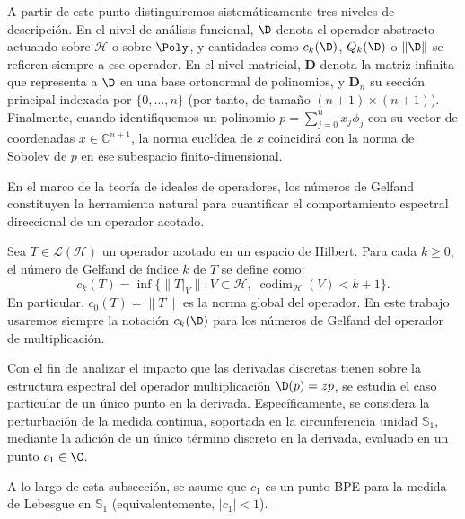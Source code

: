 \begin{rmk}
	A partir de este punto distinguiremos sistemáticamente tres niveles de descripción. En el nivel de análisis funcional, $\D$ denota el operador abstracto actuando sobre $\mathcal{H}$ o sobre $\Poly$, y cantidades como $c_k(\D)$, $Q_k(\D)$ o $\|\D\|$ se refieren siempre a ese operador. En el nivel matricial, $\mathbf{D}$ denota la matriz infinita que representa a $\D$ en una base ortonormal de polinomios, y $\mathbf{D}_n$ su sección principal indexada por $\{0,\dots,n\}$ (por tanto, de tamaño $(n+1)\times(n+1)$). Finalmente, cuando identifiquemos un polinomio $p = \sum_{j=0}^{n} x_j \phi_j$ con su vector de coordenadas $x \in \mathbb{C}^{n+1}$, la norma euclídea de $x$ coincidirá con la norma de Sobolev de $p$ en ese subespacio finito-dimensional.
\end{rmk}

En el marco de la teoría de ideales de operadores, los números de Gelfand constituyen la herramienta natural para cuantificar el comportamiento espectral direccional de un operador acotado.

\begin{defn}\label{def:numeros_gelfand}
	Sea $T \in \mathcal{L}(\mathcal{H})$ un operador acotado en un espacio de Hilbert. Para cada $k\ge 0$, el número de Gelfand de índice $k$ de $T$ se define como:
	\begin{equation}
		c_k(T) = \inf \{ \|T|_V\| : V \subset \mathcal{H}, \; \operatorname{codim}_{\mathcal{H}}(V) < k+1 \}.
	\end{equation}
	En particular, $c_0(T) = \|T\|$ es la norma global del operador. En este trabajo usaremos siempre la notación $c_k(\D)$ para los números de Gelfand del operador de multiplicación.
\end{defn}

Con el fin de analizar el impacto que las derivadas discretas tienen sobre la estructura espectral del operador multiplicación $\D(p) = zp$, se estudia el caso particular de un único punto en la derivada. Específicamente, se considera la perturbación de la medida continua, soportada en la circunferencia unidad $\mathbb{S}_1$, mediante la adición de un único término discreto en la derivada, evaluado en un punto $c_1 \in \C$.

\begin{rmk}\label{rmk:hipotesis_bpe}
	A lo largo de esta subsección, se asume que $c_1$ es un punto BPE para la medida de Lebesgue en $\mathbb{S}_1$ (equivalentemente, $|c_1| < 1$).
\end{rmk}

